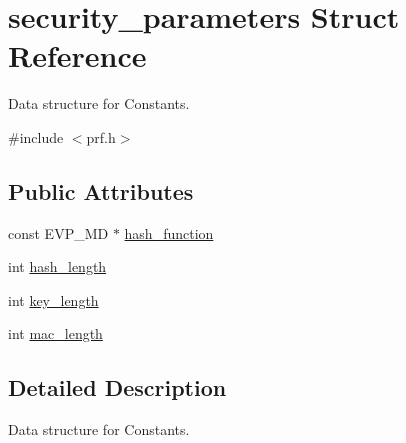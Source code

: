 \hypertarget{structsecurity__parameters}{\section{security\-\_\-parameters Struct Reference}
\label{structsecurity__parameters}
}


Data structure for Constants.  




{\ttfamily \#include $<$prf.\-h$>$}

\subsection*{Public Attributes}
\begin{DoxyCompactItemize}
\item 
const E\-V\-P\-\_\-\-M\-D $\ast$ \hyperlink{structsecurity__parameters_ac02e6339a98944f8e2a6568b6fb8ba80}{hash\-\_\-function}
\item 
int \hyperlink{structsecurity__parameters_af58c14182cabb1e46a9ddd61f0bc275f}{hash\-\_\-length}
\item 
int \hyperlink{structsecurity__parameters_a29b3227de735a7c1e0d0083a75746015}{key\-\_\-length}
\item 
int \hyperlink{structsecurity__parameters_ae14edd76dec6b2c7b9a427b892e275d0}{mac\-\_\-length}
\end{DoxyCompactItemize}


\subsection{Detailed Description}
Data structure for Constants. 


